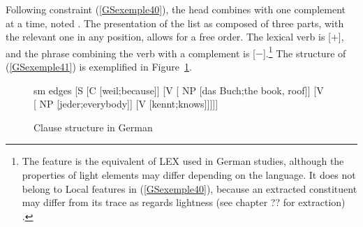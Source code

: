 \documentclass[output=paper
                ,modfonts
                ,nonflat
	        ,collection
	        ,collectionchapter
	        ,collectiontoclongg
 	        ,biblatex
                ,babelshorthands
                ,newtxmath
                ,draftmode
                ,colorlinks, citecolor=brown
]{./langsci/langscibook}
\begin{document}
{\begin{exe}
\end{exe}

Following constraint (\ref{GSexemple40}), the head combines with one complement at a time, noted . The presentation of the list as composed of three parts, with the relevant one in any position, allows for a free order. The lexical verb is [\light $+$], and the phrase combining the verb with a complement is [\light $-$].\footnote{The feature \light is the equivalent of LEX used in German studies, although the properties of light elements may differ depending on the language. It does not belong to Local features in (\ref{GSexemple40}), because an extracted constituent may differ from its trace as regards lightness (see chapter ?? for extraction) \citep{muller2018clause}.} The structure of (\ref{GSexemple41}) is exemplified in Figure~\ref{GSfigure10}.


\z


\begin{figure}
    \centering
	\begin{forest}
	sm edges
 	[S 
    [C [weil;because]]
    [V  
        [ NP [das Buch;the book, roof]]    
        [V  
            [ NP [jeder;everybody]]
            [V  [kennt;knows]]]]]
\end{forest}
    \caption{Clause structure in German}
    \label{GSfigure10}
\end{figure}


}
\end{document}
